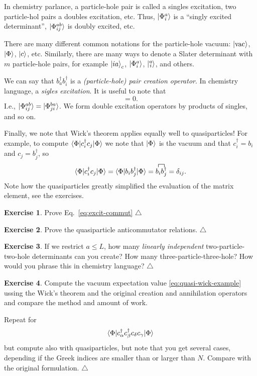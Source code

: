 \documentclass{report}
\theoremstyle{plain}
\theoremstyle{definition}
\newtheorem{exerc}{Exercise}[chapter]
\newcommand\xqed[1]{%
  \leavevmode\unskip\penalty9999 \hbox{}\nobreak\hfill
  \quad\hbox{#1}}
\newcommand\demo{\xqed{$\triangle$}}
\newenvironment{exercise}{\bigskip\begin{exerc}}{\demo\end{exerc}\bigskip}
\begin{document}
In chemistry parlance, a particle-hole pair is called a singles
excitation, two particle-hol pairs a doubles excitation, etc. Thus,
$\ket{\Phi_{i}^a}$ is a ``singly excited determinant'',
$\ket{\Phi_{ij}^{ab}}$ is doubly excited, etc.

There are many different common notations for the particle-hole
vacuum: $\ket{\text{vac}}$, $\ket{\Phi}$, $\ket{c}$, etc. Similarly, there are many
ways to denote a Slater determinant with $m$ particle-hole pairs, for
example $\ket{ia}_c$, $\ket{\Phi_i^a}$, $\ket{\substack{a\\ i}}$, and others.

We can say that $b^\dag_a b^\dag_i$ is a \emph{(particle-hole) pair
  creation operator}. In chemistry language, a \emph{sigles
  excitation}. It is useful to note that
\begin{equation}
 [  b^\dag_a b^\dag_i, \; b^\dag_b b^\dag_j ] = 0. \label{eq:excit-commut}
\end{equation}
I.e., $\ket{\Phi_{ij}^{ab}} = \ket{\Phi_{ji}^{ba}}$. We form double
excitation operators by products of singles, and so on.

Finally, we note that Wick's theorem applies equally well to
quasiparticles! For example, to compute $\braket{\Phi|c^\dag_i
  c_j|\Phi}$ we note that $\ket{\Phi}$ is the vacuum and that
$c^\dag_i = b_i$ and $c_j = b^\dag_j$, so
\begin{equation}
  \braket{\Phi|c^\dag_i c_j|\Phi} = \braket{\Phi|b_i b^\dag_j|\Phi} =
  \contraction{}{b_i}{}{b^\dag_j} b_i b^\dag_j = \delta_{ij}. \label{eq:quasi-wick-example}
\end{equation}
Note how the quasiparticles greatly simplified the evaluation of the
matrix element, see the exercises.

\begin{exercise}
  Prove Eq.~\eqref{eq:excit-commut}
\end{exercise}

\begin{exercise}
  Prove the quasiparticle anticommutator relations.
\end{exercise}

\begin{exercise}
  If we restrict $a \leq L$, how many \emph{linearly independent}
  two-particle-two-hole determinants can you create? How many
  three-particle-three-hole? How would you phrase this in chemistry language?
\end{exercise}

\begin{exercise}
  Compute the vacuum expectation value \eqref{eq:quasi-wick-example}
  ussing the Wick's theorem and the original creation and annihilation
  operators and compare the method and amount of work.

  Repeat for
  \begin{equation}
    \braket{\Phi|c^\dag_\alpha c^\dag_\beta c_\delta c_\gamma|\Phi} 
  \end{equation}
  but compute also with quasiparticles, but note that you get several
  cases, depending if the Greek indices are smaller than or larger
  than $N$. Compare with the original formulation.
\end{exercise}
\end{document}
